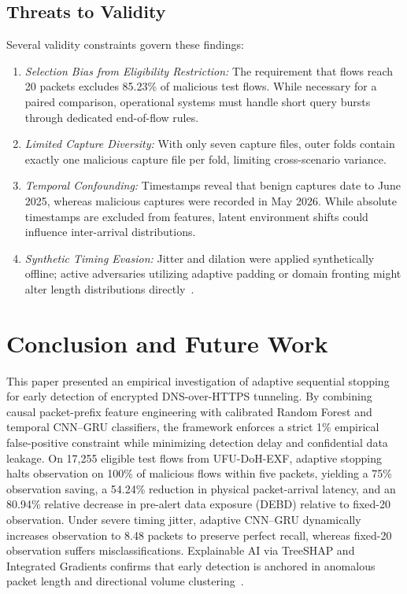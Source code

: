 \documentclass[conference]{IEEEtran}
\begin{document}
\subsection{Threats to Validity}
Several validity constraints govern these findings:
\begin{enumerate}
    \item \emph{Selection Bias from Eligibility Restriction:} The requirement that flows reach 20 packets excludes 85.23\% of malicious test flows. While necessary for a paired comparison, operational systems must handle short query bursts through dedicated end-of-flow rules.
    \item \emph{Limited Capture Diversity:} With only seven capture files, outer folds contain exactly one malicious capture file per fold, limiting cross-scenario variance.
    \item \emph{Temporal Confounding:} Timestamps reveal that benign captures date to June 2025, whereas malicious captures were recorded in May 2026. While absolute timestamps are excluded from features, latent environment shifts could influence inter-arrival distributions.
    \item \emph{Synthetic Timing Evasion:} Jitter and dilation were applied synthetically offline; active adversaries utilizing adaptive padding or domain fronting might alter length distributions directly~\cite{li2025,moulya2026}.
\end{enumerate}

\section{Conclusion and Future Work}
This paper presented an empirical investigation of adaptive sequential stopping for early detection of encrypted DNS-over-HTTPS tunneling. By combining causal packet-prefix feature engineering with calibrated Random Forest and temporal CNN--GRU classifiers, the framework enforces a strict 1\% empirical false-positive constraint while minimizing detection delay and confidential data leakage. On 17,255 eligible test flows from UFU-DoH-EXF, adaptive stopping halts observation on 100\% of malicious flows within five packets, yielding a 75\% observation saving, a 54.24\% reduction in physical packet-arrival latency, and an 80.94\% relative decrease in pre-alert data exposure (DEBD) relative to fixed-20 observation. Under severe timing jitter, adaptive CNN--GRU dynamically increases observation to 8.48 packets to preserve perfect recall, whereas fixed-20 observation suffers misclassifications. Explainable AI via TreeSHAP and Integrated Gradients confirms that early detection is anchored in anomalous packet length and directional volume clustering~\cite{niktabe2024,zebin2022}.
\end{document}
